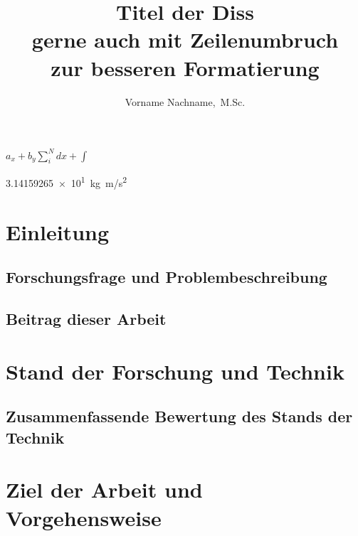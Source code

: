 \documentclass[%
english, ngerman,%
]{isw_smb_diss} %
\title{Titel der Diss\\gerne auch mit Zeilenumbruch\\zur besseren Formatierung}
\author{Vorname Nachname,~M.Sc.}
\institute{Institut für Steuerungstechnik der Werkzeugmaschinen und Fertigungseinrichtungen}
\begin{document}
\frontmatter
\maketitle
\onehalfspacing %

\(a_x + b_y \sum_i^N dx + \int\) 

\SI{3.14159265e1}{kg.m/s^2} \cite{colu92}






\cleardoublepage
\ifpdf
\fi
\tableofcontents

\mainmatter %

\chapter{Einleitung}

\Blindtext

\section{Forschungsfrage und Problembeschreibung}
\section{Beitrag dieser Arbeit}


\chapter{Stand der Forschung und Technik}
\section{Zusammenfassende Bewertung des Stands der Technik}

\chapter{Ziel der Arbeit und Vorgehensweise}

\end{document}
